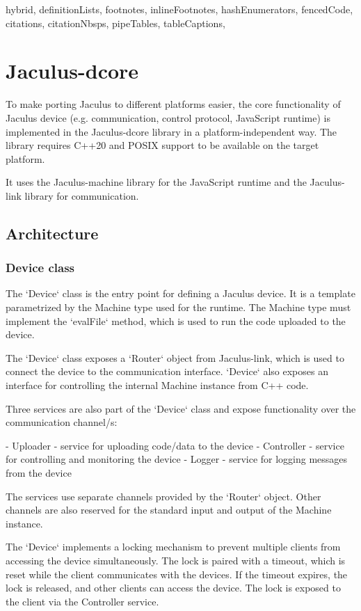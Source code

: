 \begin{markdown*}{%
  hybrid,
  definitionLists,
  footnotes,
  inlineFootnotes,
  hashEnumerators,
  fencedCode,
  citations,
  citationNbsps,
  pipeTables,
  tableCaptions,
}

\chapter{Jaculus-dcore}

To make porting Jaculus to different platforms easier, the core functionality of Jaculus device (e.g. communication, control protocol, JavaScript runtime) is implemented in the Jaculus-dcore library in a platform-independent way. The library requires C++20 and POSIX support to be available on the target platform.

It uses the Jaculus-machine library for the JavaScript runtime and the Jaculus-link library for communication.

\section{Architecture}

\subsection{Device class}

The `Device` class is the entry point for defining a Jaculus device. It is a template parametrized by the Machine type used for the runtime. The Machine type must implement the `evalFile` method, which is used to run the code uploaded to the device.

The `Device` class exposes a `Router` object from Jaculus-link, which is used to connect the device to the communication interface. `Device` also exposes an interface for controlling the internal Machine instance from C++ code.

Three services are also part of the `Device` class and expose functionality over the communication channel/s:

  - Uploader - service for uploading code/data to the device
  - Controller - service for controlling and monitoring the device
  - Logger - service for logging messages from the device

The services use separate channels provided by the `Router` object. Other channels are also reserved for the standard input and output of the Machine instance.

The `Device` implements a locking mechanism to prevent multiple clients from accessing the device simultaneously. The lock is paired with a timeout, which is reset while the client communicates with the devices. If the timeout expires, the lock is released, and other clients can access the device. The lock is exposed to the client via the Controller service.



\end{markdown*}
